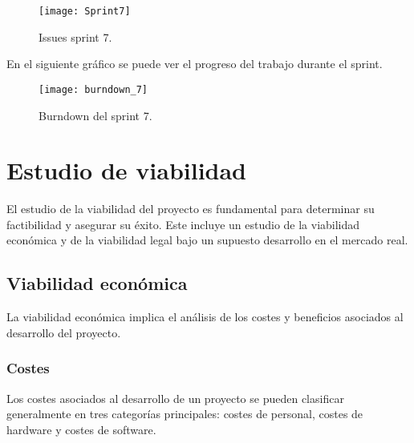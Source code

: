 \newpage
\begin{figure}[htb]
    \centering
    \texttt{[image: Sprint7]}
    \caption{Issues sprint 7.}
    \label{fig:Sprint7}
\end{figure}
\newpage
En el siguiente gráfico se puede ver el progreso del trabajo durante el sprint.
\begin{figure}[htb]
    \centering
    \texttt{[image: burndown\_7]}
    \caption{Burndown del sprint 7.}
    \label{fig:burndown_7}
\end{figure}

\section{Estudio de viabilidad}
El estudio de la viabilidad del proyecto es fundamental para determinar su factibilidad y asegurar su éxito.
Este incluye un estudio de la viabilidad económica y de la viabilidad legal bajo un supuesto desarrollo en el mercado real.

\subsection{Viabilidad económica}
La viabilidad económica implica el análisis de los costes y beneficios asociados al desarrollo del proyecto.

\subsubsection{Costes}
Los costes asociados al desarrollo de un proyecto se pueden clasificar generalmente en tres categorías principales: costes de personal, costes de hardware y costes de software.

